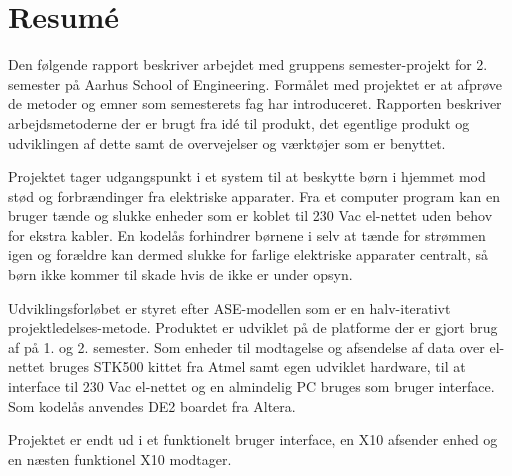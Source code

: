 \chapter*{Resumé}

Den følgende rapport beskriver arbejdet med gruppens semester-projekt for 2. semester på Aarhus School of Engineering. Formålet med projektet er at afprøve de metoder og emner som semesterets fag har introduceret. Rapporten beskriver arbejdsmetoderne der er brugt fra idé til produkt, det egentlige produkt og udviklingen af dette samt de overvejelser og værktøjer som er benyttet.

Projektet tager udgangspunkt i et system til at beskytte børn i hjemmet mod stød og forbrændinger fra elektriske apparater. Fra et computer program kan en bruger tænde og slukke enheder som er koblet til 230 Vac el-nettet uden behov for ekstra kabler. En kodelås forhindrer børnene i selv at tænde for strømmen igen og forældre kan dermed slukke for farlige elektriske apparater centralt, så børn ikke kommer til skade hvis de ikke er under opsyn. 

Udviklingsforløbet er styret efter ASE-modellen som er en halv-iterativt projektledelses-metode. Produktet er udviklet på de platforme der er gjort brug af på 1. og 2. semester. Som enheder til modtagelse og afsendelse af data over el-nettet bruges STK500 kittet fra Atmel samt egen udviklet hardware, til at interface til 230 Vac el-nettet og en almindelig PC bruges som bruger interface. Som kodelås anvendes DE2 boardet fra Altera.

Projektet er endt ud i et funktionelt bruger interface, en X10 afsender enhed og en næsten funktionel X10 modtager.
